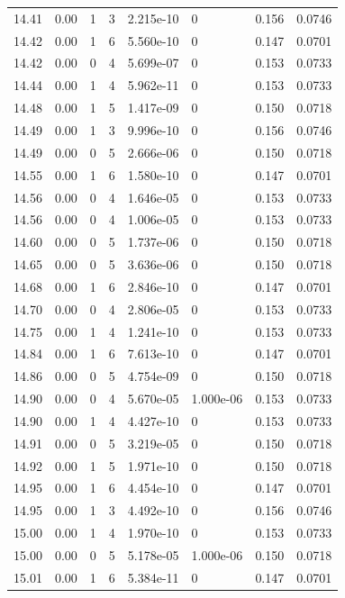 \documentclass[preview]{standalone}
\begin{document}
{{{{{{{{{{{{{{\begin{tabular}{L{1.2cm}C{1.2cm} C{0.3cm}C{0.5cm} C{1.4cm}C{1.4cm} C{1.4cm}C{1.4cm}}
  14.41  &  0.00  & 1     &  3 &  2.215e-10  & 0  & 0.156 &  0.0746   \\ 
  14.42  &  0.00  & 1     &  6 &  5.560e-10  & 0  & 0.147 &  0.0701   \\ 
  14.42  &  0.00  & 0     &  4 &  5.699e-07  & 0  & 0.153 &  0.0733   \\ 
  14.44  &  0.00  & 1     &  4 &  5.962e-11  & 0  & 0.153 &  0.0733   \\ 
  14.48  &  0.00  & 1     &  5 &  1.417e-09  & 0  & 0.150 &  0.0718   \\ 
  14.49  &  0.00  & 1     &  3 &  9.996e-10  & 0  & 0.156 &  0.0746   \\ 
  14.49  &  0.00  & 0     &  5 &  2.666e-06  & 0  & 0.150 &  0.0718   \\ 
  14.55  &  0.00  & 1     &  6 &  1.580e-10  & 0  & 0.147 &  0.0701   \\ 
  14.56  &  0.00  & 0     &  4 &  1.646e-05  & 0  & 0.153 &  0.0733   \\ 
  14.56  &  0.00  & 0     &  4 &  1.006e-05  & 0  & 0.153 &  0.0733   \\ 
  14.60  &  0.00  & 0     &  5 &  1.737e-06  & 0  & 0.150 &  0.0718   \\ 
  14.65  &  0.00  & 0     &  5 &  3.636e-06  & 0  & 0.150 &  0.0718   \\ 
  14.68  &  0.00  & 1     &  6 &  2.846e-10  & 0  & 0.147 &  0.0701   \\ 
  14.70  &  0.00  & 0     &  4 &  2.806e-05  & 0  & 0.153 &  0.0733   \\ 
  14.75  &  0.00  & 1     &  4 &  1.241e-10  & 0  & 0.153 &  0.0733   \\ 
  14.84  &  0.00  & 1     &  6 &  7.613e-10  & 0  & 0.147 &  0.0701   \\ 
  14.86  &  0.00  & 0     &  5 &  4.754e-09  & 0  & 0.150 &  0.0718   \\ 
  14.90  &  0.00  & 0     &  4 &  5.670e-05  & 1.000e-06  & 0.153 &  0.0733   \\ 
  14.90  &  0.00  & 1     &  4 &  4.427e-10  & 0  & 0.153 &  0.0733   \\ 
  14.91  &  0.00  & 0     &  5 &  3.219e-05  & 0  & 0.150 &  0.0718   \\ 
  14.92  &  0.00  & 1     &  5 &  1.971e-10  & 0  & 0.150 &  0.0718   \\ 
  14.95  &  0.00  & 1     &  6 &  4.454e-10  & 0  & 0.147 &  0.0701   \\ 
  14.95  &  0.00  & 1     &  3 &  4.492e-10  & 0  & 0.156 &  0.0746   \\ 
  15.00  &  0.00  & 1     &  4 &  1.970e-10  & 0  & 0.153 &  0.0733   \\ 
  15.00  &  0.00  & 0     &  5 &  5.178e-05  & 1.000e-06  & 0.150 &  0.0718   \\ 
  15.01  &  0.00  & 1     &  6 &  5.384e-11  & 0  & 0.147 &  0.0701   \\ 
\hline 
\end{tabular} 

}}}}}}}}}}}}}}
\end{document}
